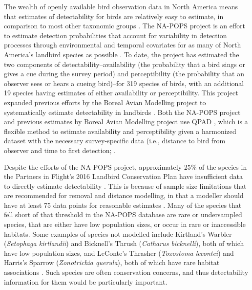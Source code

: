 \documentclass[12pt]{article}
\begin{document}
\par The wealth of openly available bird observation data in North America means that estimates of detectability for birds are relatively easy to estimate, in comparison to most other taxonomic groups \citep{bennett_how_2023}. 
The NA-POPS project is an effort to estimate detection probabilities that account for variability in detection processes through environmental and temporal covariates for as many of North America’s landbird species as possible \citep{edwards_point_2023}.
To date, the project has estimated the two components of detectability--availability (the probability that a bird sings or gives a cue during the survey period) and perceptibility (the probability that an observer sees or hears a cueing bird)--for 319 species of birds, with an additional 19 species having estimates of either availability or perceptibility. This project expanded previous efforts by the Boreal Avian Modelling project \citep{cumming_toward_2010} to systematically estimate detectability in landbirds \citep{solymos_calibrating_2013, solymos_evaluating_2018}.
Both the NA-POPS project and previous estimates by Boreal Avian Modelling project use QPAD \citep{solymos_calibrating_2013}, which is a flexible method to estimate availability and perceptibility given a harmonized dataset with the necessary survey-specific data (i.e., distance to bird from observer and time to first detection; \citet{barker_ecological_2015}.

\par Despite the efforts of the NA-POPS project, approximately 25\% of the species in the Partners in Flight’s 2016 Landbird Conservation Plan \citep{rosenberg_partners_2016} have insufficient data to directly estimate detectability \citep{edwards_point_2023}.
This is because of sample size limitations that are recommended for removal and distance modelling, in that a modeller should have at least 75 data points for reasonable estimates \citep{buckland_introduction_2001, solymos_calibrating_2013}. 
Many of the species that fell short of that threshold in the NA-POPS database are rare or undersampled species, that are either have low population sizes, or occur in rare or inaccessible habitats.
Some examples of species not modelled include Kirtland’s Warbler (\textit{Setophaga kirtlandii}) and Bicknell’s Thrush (\textit{Catharus bicknelli}), both of which have low population sizes, and LeConte’s Thrasher (\textit{Toxostoma lecontei}) and Harris’s Sparrow (\textit{Zonotrichia querula}), both of which have rare habitat associations \citep{will_handbook_2020}. 
Such species are often conservation concerns, and thus detectability information for them would be particularly important.
\end{document}
